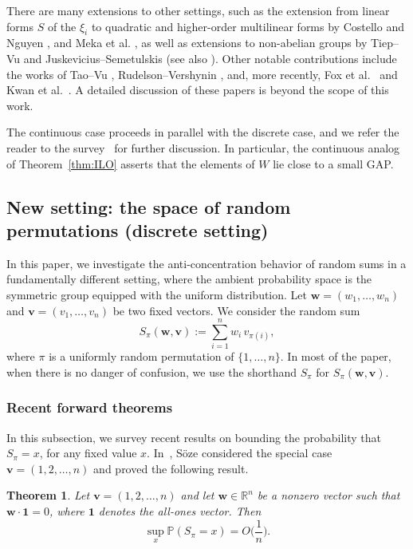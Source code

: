 \documentclass[reqno]{amsart}
\newcommand\R{{\mathbb{R}}}
\renewcommand\P{{\mathbb{P}}}
\newcommand\BMv{{\bm v}}
\newcommand\BMw{{\bm w}}
\theoremstyle{plain}
\newtheorem{theorem}{Theorem}[section]
\theoremstyle{definition}
\begin{document}
There are many extensions to other settings, such as the extension from linear forms \(S\) of the \(\xi_i\) to quadratic and higher-order multilinear forms by Costello and Nguyen \cite{Cost,Ng-Duke}, and Meka et al. \cite{Meka}, as well as extensions to non-abelian groups by Tiep–Vu \cite{TiepV} and Juskevicius--Semetulskis \cite{JS} (see also \cite{KNgP,Ng-unpublished,Tao}). 
Other notable contributions include the works of Tao–Vu \cite{TVcir}, Rudelson--Vershynin \cite{RV}, and, more recently, Fox et al.\ \cite{Fox} and Kwan et al.\ \cite{KwanSSS,KwanS}. 
A detailed discussion of these papers is beyond the scope of this work. 

The continuous case proceeds in parallel with the discrete case, and we refer
the reader to the survey~\cite{NVsur} for further discussion. In particular, the
continuous analog of Theorem~\ref{thm:ILO} asserts that the elements of $W$
lie close to a small GAP.


\subsection{New setting: the space of random permutations (discrete setting)}

In this paper, we investigate the anti-concentration behavior of random sums in
a fundamentally different setting, where the ambient probability space is the
symmetric group equipped with the uniform distribution. Let
$\BMw=(w_1,\dots,w_n)$ and $\BMv=(v_1,\dots,v_n)$ be two fixed
vectors. We consider the random sum
\begin{equation}\label{eqn:S_p}
S_{\pi} (\BMw, \BMv)  := \sum_{i=1}^n w_{i}\, v_{\pi(i)},
\end{equation}  
where $\pi$ is a uniformly random permutation of $\{1,\dots,n\}$. In most of
the paper, when there is no danger of confusion, we use the shorthand
$S_{\pi}$ for  $S_{\pi} (\BMw, \BMv)$. 

\subsubsection {Recent forward theorems}\label{subsection:discrete} 
In this subsection, we survey recent results on bounding  the probability that $S_{\pi}=x$, for any fixed
value $x$.  In~\cite{Soze2}, S{\"o}ze considered the special case
$\BMv=(1,2,\dots,n)$ and proved the following result.

\begin{theorem}\label{thm:soze_main}
Let $\BMv=(1,2,\dots,n)$ and let $\BMw\in\R^n$ be a nonzero vector such that
$\BMw\cdot\mathbf{1}=0$, where $\mathbf{1}$ denotes the all-ones vector. Then
\[
\sup_x \P(S_{\pi}=x)=O\Big(\frac{1}{n}\Big).
\]
\end{theorem}
\end{document}
